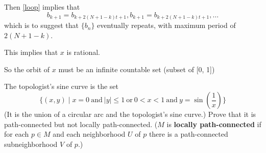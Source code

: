 \documentclass[a4paper, 12pt]{article}
\begin{document}
\begin{solution}
    Then \eqref{loop} implies that \[
    b_{k+1} = b_{k+2(N+1-k)t + 1}, b_{k+1} = b_{k+2(N+1-k)t + 1}, \dots
    \]
    which is to suggest that $\{b_n\}$ eventually repeats, with maximum period of $2(N+1-k)$.

    This implies that $x$ is rational. \contra

    So the orbit of $x$ must be an infinite countable set (subset of [0, 1])
\end{solution}
\begin{problem} [2.81* (EC)]
The topologist's sine curve is the set \[
    \{(x, y) \mid x = 0 \:\text{and}\:  |y| \leq 1 \:\text{or}\: 0 < x < 1 \:\text{and}\:  y = \sin (\frac{1}{x})\}
\]
(It is the union of a circular arc and the topologist's sine curve.) Prove that it is path-connected but not locally path-connected. ($M$ is \textbf{locally path-connected} if for each $p \in M$ and each neighborhood $U$ of $p$ there is a path-connected subneighborhood $V$ of $p$.)
\end{problem}
\begin{solution}
\end{solution}
\end{document}
